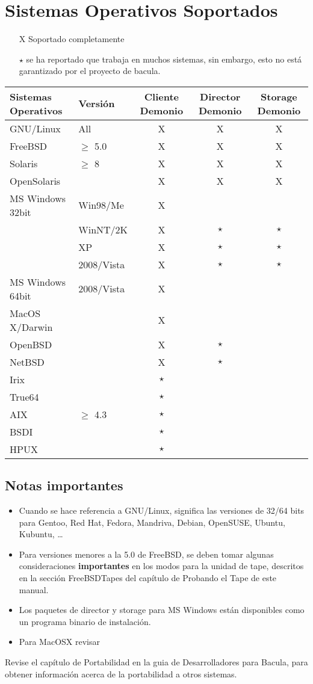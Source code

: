 
\chapter{Sistemas Operativos Soportados} \label{SupportedOSes} 
\begin{itemize}
\item [X] Soportado completamente 
\item [$\star$] se ha reportado que trabaja en muchos sistemas, sin embargo, esto
no está garantizado por el proyecto de bacula. 
\end{itemize}
\begin{tabular}{|l|l|c|c|c|}
\hline 
Sistemas Operativos  & Versión  & Cliente {\small {Demonio} }  & Director {\small {Demonio} }  & Storage {\small {Demonio} }\tabularnewline
\hline
\hline 
GNU/Linux  & All  & X  & X  & X \tabularnewline
\hline 
FreeBSD  & $\geq$ 5.0  & X  & X  & X \tabularnewline
\hline 
Solaris  & $\geq$ 8  & X  & X  & X \tabularnewline
\hline 
OpenSolaris  & ~  & X  & X  & X \tabularnewline
\hline
\hline 
MS Windows 32bit  & Win98/Me  & X  & ~  & ~ \tabularnewline
\hline 
~  & WinNT/2K  & X  & $\star$  & $\star$ \tabularnewline
\hline 
~  & XP  & X  & $\star$  & $\star$ \tabularnewline
~  & 2008/Vista  & X  & $\star$  & $\star$ \tabularnewline
MS Windows 64bit  & 2008/Vista  & X  & ~  & ~ \tabularnewline
\hline
\hline 
MacOS X/Darwin  & ~  & X  & ~  & ~ \tabularnewline
\hline 
OpenBSD  & ~  & X  & $\star$  & ~ \tabularnewline
\hline 
NetBSD  & ~  & X  & $\star$  & ~ \tabularnewline
\hline 
Irix  & ~  & $\star$  & ~  & ~ \tabularnewline
\hline 
True64  & ~  & $\star$  & ~  & ~ \tabularnewline
\hline 
AIX  & $\geq$ 4.3  & $\star$  & ~  & ~ \tabularnewline
\hline 
BSDI  & ~  & $\star$  & ~  & ~ \tabularnewline
\hline 
HPUX  & ~  & $\star$  & ~  & ~ \tabularnewline
\hline
\end{tabular}


\section*{Notas importantes}
\begin{itemize}
\item Cuando se hace referencia a GNU/Linux, significa las versiones de 32/64 bits
para Gentoo, Red Hat, Fedora, Mandriva, Debian, OpenSUSE, Ubuntu, Kubuntu, {\ldots{}} 
\item Para versiones menores a la 5.0 de FreeBSD, se deben tomar algunas consideraciones
\textbf{importantes} en los modos para la unidad de tape, descritos en la sección
 {FreeBSDTapes} del capítulo de Probando
el Tape de este manual. 
\item Los paquetes de director y storage para MS Windows están disponibles como un
programa binario de instalación. 
\item Para MacOSX revisar  
\end{itemize}
Revise el capítulo de Portabilidad en la guia de Desarrolladores para Bacula,
para obtener información acerca de la portabilidad a otros sistemas.

